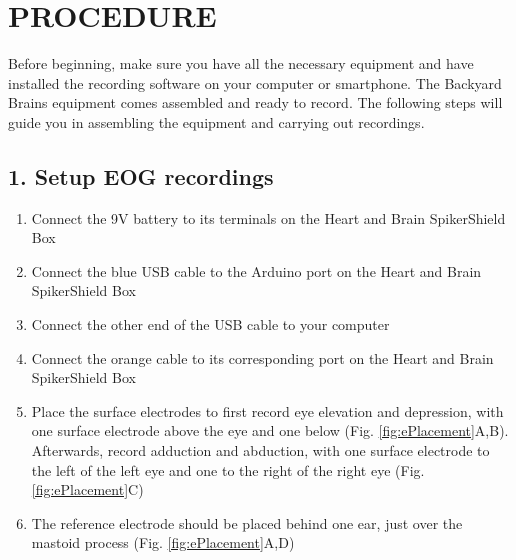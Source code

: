 \documentclass[12pt]{article}
\begin{document}
\section*{PROCEDURE}

Before beginning, make sure you have all the necessary equipment and have installed the recording software on your computer or smartphone. The Backyard Brains equipment comes assembled and ready to record. The following steps will guide you in assembling the equipment and carrying out recordings.

\subsection*{1. Setup EOG recordings}

\begin{enumerate}
\item Connect the 9V battery to its terminals on the Heart and Brain SpikerShield Box
\item Connect the blue USB cable to the Arduino port on the Heart and Brain SpikerShield Box
\item Connect the other end of the USB cable to your computer 
\item Connect the orange cable to its corresponding port on the Heart and Brain SpikerShield Box
\item Place the surface electrodes to first record eye elevation and depression, with one surface electrode above the eye and one below (Fig. \ref{fig:ePlacement}A,B). Afterwards, record adduction and abduction, with one surface electrode to the left of the left eye and one to the right of the right eye (Fig. \ref{fig:ePlacement}C)
\item The reference electrode should be placed behind one ear, just over the mastoid process (Fig. \ref{fig:ePlacement}A,D)

\vspace{0.2cm}


\end{enumerate}
\end{document}
